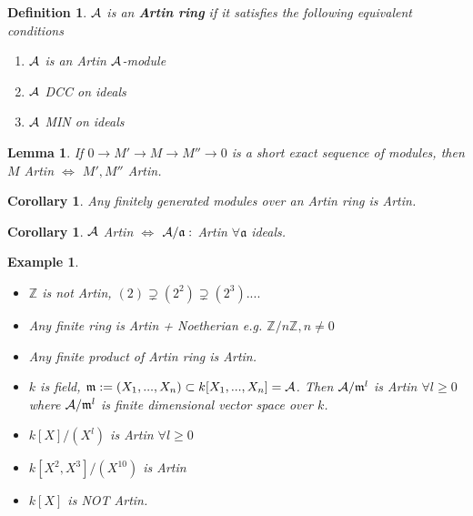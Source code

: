 \documentclass[11pt]{article}
\newtheorem{lemma}[thm]{Lemma}
\newtheorem{cor}[thm]{Corollary}
\newtheorem{dfn}[thm]{Definition}
\newtheorem{ex}[thm]{Example}
\newcommand{\intg}{\mathbb Z}
\newcommand{\sca}{{\mathfrak a}}
\newcommand{\scm}{{\mathfrak m}}
\newcommand{\cala}{{\cal A}}
\newcommand{\lrta}{\longrightarrow}
\newcommand{\Llrta}{\Longleftrightarrow}
\begin{document}
\begin{dfn}
$\cala$ is an \textbf{Artin ring } if it satisfies the following equivalent conditions
\begin{enumerate}[label=(\roman*)]
\item $\cala$ is an Artin $\cala$-module
\item $\cala$ DCC on ideals
\item $\cala$ MIN on ideals
\end{enumerate}
\end{dfn}

\begin{lemma}\label{lem:SES_Artin}
If $0\lrta M'\lrta M\lrta M''\lrta 0$ is a short exact sequence of modules, then $M$ Artin $\Llrta$ $M', M''$ Artin.
\end{lemma}
\begin{cor}
Any finitely generated modules over an Artin ring is Artin.
\end{cor}
\begin{cor}
$\cala$ Artin $\Llrta $ $\cala/\sca:$ Artin $\forall \sca$ ideals.
\end{cor}

\begin{ex}\ 
\begin{itemize}
\item $\intg $ is not Artin,
$(2)\supsetneq (2^2)\supsetneq (2^3)....$
\item Any finite ring is Artin + Noetherian e.g. $\intg/n\intg,n\neq 0$
\item Any finite product of Artin ring is Artin.
\item $k$ is field, $\scm:=(X_1,...,X_n)\subset k[X_1,...,X_n]=\cala$. Then $\cala/\scm^l$ is Artin $\forall l\geq 0$ where $\cala/\scm^l$ is finite dimensional vector space over $k$.
\item $k[X]/(X^l)$ is Artin $\forall l\geq 0$
\item $k[X^2,X^3]/(X^{10})$ is Artin
\item $k[X]$ is NOT Artin.
\end{itemize}
\end{ex}
\end{document}
